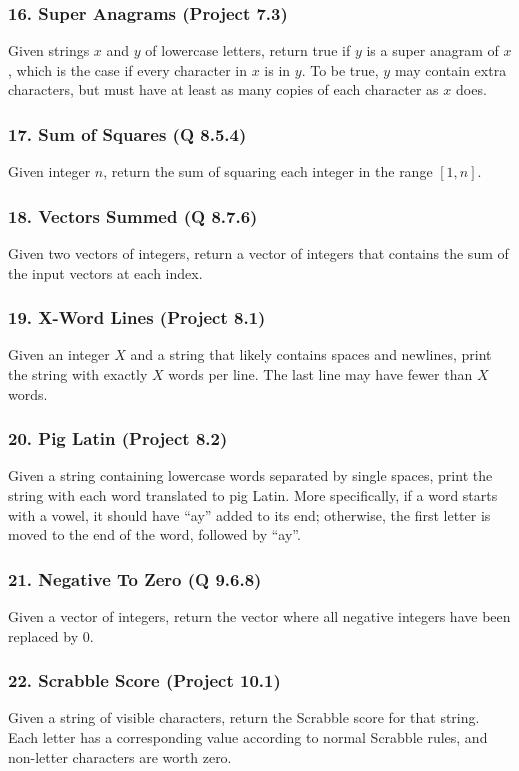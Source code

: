 \documentclass{sig-alternate}
\begin{document}
\subsubsection*{16. Super Anagrams (Project 7.3)}
Given strings $x$ and $y$ of lowercase letters, return true if $y$ is a super anagram of $x$, which is the case if every character in $x$ is in $y$. To be true, $y$ may contain extra characters, but must have at least as many copies of each character as $x$ does.

\subsubsection*{17. Sum of Squares (Q 8.5.4)}
Given integer $n$, return the sum of squaring each integer in the range $[1, n]$.

\subsubsection*{18. Vectors Summed (Q 8.7.6)}
Given two vectors of integers, return a vector of integers that contains the sum of the input vectors at each index.

\subsubsection*{19. X-Word Lines (Project 8.1)}
Given an integer $X$  and a string that likely contains spaces and newlines, print the string with exactly $X$ words per line. The last line may have fewer than $X$ words.

\subsubsection*{20. Pig Latin (Project 8.2)}
Given a string containing lowercase words separated by single spaces, print the string with each word translated to pig Latin. More specifically, if a word starts with a vowel, it should have ``ay'' added to its end; otherwise, the first letter is moved to the end of the word, followed by ``ay''.

\subsubsection*{21. Negative To Zero (Q 9.6.8)}
Given a vector of integers, return the vector where all negative integers have been replaced by 0.

\subsubsection*{22. Scrabble Score (Project 10.1)}
Given a string of visible characters, return the Scrabble score for that string. Each letter has a corresponding value according to normal Scrabble rules, and non-letter characters are worth zero.
\end{document}
